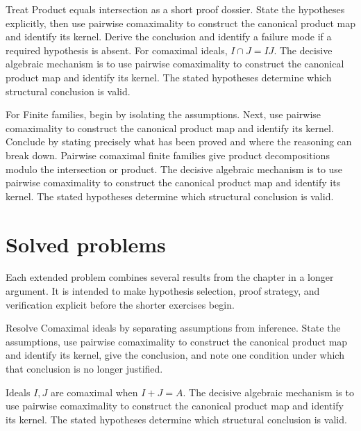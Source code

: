 \begin{example}\label{ex:v04-worked-03}
Treat Product equals intersection as a short proof dossier. State the hypotheses explicitly, then use pairwise comaximality to construct the canonical product map and identify its kernel. Derive the conclusion and identify a failure mode if a required hypothesis is absent. For comaximal ideals, $I\cap J=IJ$. The decisive algebraic mechanism is to use pairwise comaximality to construct the canonical product map and identify its kernel. The stated hypotheses determine which structural conclusion is valid.
\end{example}

\begin{example}\label{ex:v04-worked-04}
For Finite families, begin by isolating the assumptions. Next, use pairwise comaximality to construct the canonical product map and identify its kernel. Conclude by stating precisely what has been proved and where the reasoning can break down. Pairwise comaximal finite families give product decompositions modulo the intersection or product. The decisive algebraic mechanism is to use pairwise comaximality to construct the canonical product map and identify its kernel. The stated hypotheses determine which structural conclusion is valid.
\end{example}

\section{Solved problems}
Each extended problem combines several results from the chapter in a longer argument. It is intended to make hypothesis selection, proof strategy, and verification explicit before the shorter exercises begin.

\begin{problem}\label{prob:v04-problem-01}
Resolve Comaximal ideals by separating assumptions from inference. State the assumptions, use pairwise comaximality to construct the canonical product map and identify its kernel, give the conclusion, and note one condition under which that conclusion is no longer justified.
\end{problem}
\begin{solution}
Ideals $I,J$ are comaximal when $I+J=A$. The decisive algebraic mechanism is to use pairwise comaximality to construct the canonical product map and identify its kernel. The stated hypotheses determine which structural conclusion is valid.
\end{solution}

